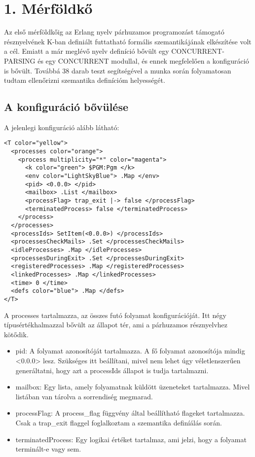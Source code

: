 \documentclass[]{article}
\begin{document}
\section*{1. Mérföldkő}
Az első mérföldkőig az Erlang nyelv párhuzamos programozást támogató résznyelvének K-ban definiált futtatható formális szemantikájának elkészítése volt a cél. Emiatt a már meglévő nyelv definíció bővült egy CONCURRENT-PARSING és egy CONCURRENT modullal, és ennek megfelelően a konfiguráció is bővült. Továbbá 38 darab teszt segítségével a munka során folyamatosan tudtam ellenőrizni szemantika definícióm helyességét.

\subsection*{A konfiguráció bővülése}
A jelenlegi konfiguráció alább látható:

\lstset{language=XML}
\begin{lstlisting}
<T color="yellow">
  <processes color="orange">
    <process multiplicity="*" color="magenta">
      <k color="green"> $PGM:Pgm </k>
      <env color="LightSkyBlue"> .Map </env>
      <pid> <0.0.0> </pid>
      <mailbox> .List </mailbox>
      <processFlag> trap_exit |-> false </processFlag>
      <terminatedProcess> false </terminatedProcess>
    </process>
  </processes>
  <processIds> SetItem(<0.0.0>) </processIds>
  <processesCheckMails> .Set </processesCheckMails>
  <idleProcesses> .Map </idleProcesses>
  <processesDuringExit> .Set </processesDuringExit>
  <registeredProcesses> .Map </registeredProcesses>
  <linkedProcesses> .Map </linkedProcesses>
  <time> 0 </time>
  <defs color="blue"> .Map </defs>
</T>
\end{lstlisting}

A processes tartalmazza, az összes futó folyamat konfigurációját. Itt négy típusértékhalmazzal bővült az állapot tér, ami a párhuzamos résznyelvhez kötődik.

\begin{itemize}
\item pid: A folyamat azonosítóját tartalmazza. A fő folyamat azonosítója mindig <0.0.0> lesz. Szükséges itt beállítani, mivel nem lehet úgy véletlenszerűen generáltatni, hogy azt a processIds állapot is tudja tartalmazni.
\item mailbox: Egy lista, amely folyamatnak küldött üzeneteket tartalmazza. Mivel listában van tárolva a sorrendiség megmarad.
\item processFlag: A process\_flag függvény által beállítható flageket tartalmazza. Csak a trap\_exit flaggel foglalkoztam a szemantika definíálás során.
\item terminatedProcess: Egy logikai értéket tartalmaz, ami jelzi, hogy a folyamat terminált-e vagy sem.
\end{itemize}
\end{document}
